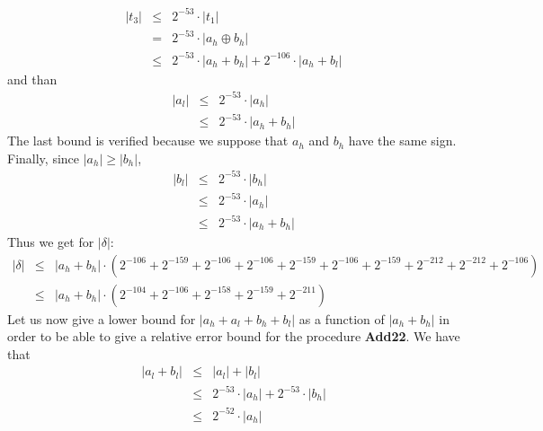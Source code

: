 \documentclass[a4paper,10pt,twoside]{article}
\newenvironment{proof}[1][Proof]{\begin{trivlist}
\item[\hskip \labelsep {\bfseries #1}]}{\end{trivlist}}
\newcommand{\hi}{\ensuremath{\mathit{h}}}
\newcommand{\lo}{\ensuremath{\mathit{l}}}
\newcommand{\AddDD}{{\bf Add22}}
\begin{document}
\begin{proof}
\begin{eqnarray*}
\left \vert t_3 \right \vert & \leq & 2^{-53} \cdot \left \vert t_1 \right \vert \\
& = & 2^{-53} \cdot \left \vert a_\hi \oplus b_\hi \right \vert \\
& \leq & 2^{-53} \cdot \left \vert a_\hi + b_\hi \right \vert + 2^{-106} \cdot \left \vert a_\hi + b_\lo \right \vert 
\end{eqnarray*}
and than
\begin{eqnarray*}
\left \vert a_\lo \right \vert & \leq & 2^{-53} \cdot \left \vert a_\hi \right \vert \\
& \leq & 2^{-53} \cdot \left \vert a_\hi + b_\hi \right \vert 
\end{eqnarray*}
The last bound is verified because we suppose that $a_\hi$ and $b_\hi$ have the
same sign. \\
Finally, since $\left \vert a_\hi \right \vert \geq \left \vert b_\hi \right \vert$, 
\begin{eqnarray*}
\left \vert b_\lo \right \vert & \leq & 2^{-53} \cdot \left \vert b_\hi \right \vert \\
& \leq & 2^{-53} \cdot \left \vert a_\hi \right \vert \\
& \leq & 2^{-53} \cdot \left \vert a_\hi + b_\hi \right \vert 
\end{eqnarray*} 
Thus we get for $\left \vert \delta \right \vert$:
\begin{eqnarray*}
\left \vert \delta \right \vert & \leq & \left \vert a_\hi + b_\hi \right \vert \cdot \left(
                                         2^{-106} + 2^{-159} + 2^{-106} + 2^{-106} + 2^{-159} + 
                                         2^{-106} + 2^{-159} + 2^{-212} + 2^{-212} + 2^{-106} \right) \\
& \leq & \left \vert a_\hi + b_\hi \right \vert \cdot \left( 2^{-104} + 2^{-106} + 2^{-158} + 2^{-159} + 2^{-211} \right)
\end{eqnarray*}
Let us now give a lower bound for $\left \vert a_\hi + a_\lo + b_\hi + b_\lo
\right \vert$ as a function of $\left \vert a_\hi + b_\hi \right \vert$
in order to be able to give a relative error bound for the procedure
\AddDD. We have that 
\begin{eqnarray*}
\left \vert a_\lo + b_\lo \right \vert & \leq & \left \vert a_\lo \right \vert + \left \vert b_\lo \right \vert \\
& \leq & 2^{-53} \cdot \left \vert a_\hi \right \vert + 2^{-53} \cdot \left \vert b_\hi \right \vert \\
& \leq & 2^{-52} \cdot \left \vert a_\hi \right \vert \\

\end{eqnarray*}
\end{proof}
\end{document}
